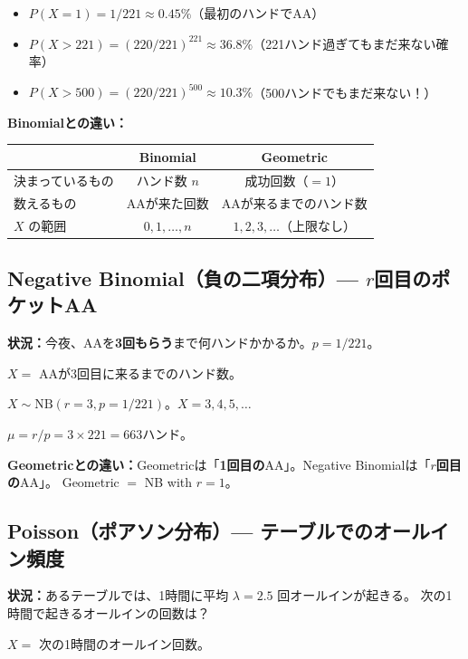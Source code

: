 \documentclass{article}
\theoremstyle{remark}
\begin{document}
\begin{itemize}
  \item $P(X = 1) = 1/221 \approx 0.45\%$（最初のハンドでAA）
  \item $P(X > 221) = (220/221)^{221} \approx 36.8\%$（221ハンド過ぎてもまだ来ない確率）
  \item $P(X > 500) = (220/221)^{500} \approx 10.3\%$（500ハンドでもまだ来ない！）
\end{itemize}

\textbf{Binomialとの違い：}
\begin{center}
  \begin{tabular}{lcc}
    \toprule
    & Binomial & Geometric \\ \midrule
    決まっているもの & ハンド数 $n$ & 成功回数（$=1$） \\
    数えるもの & AAが来た回数 & AAが来るまでのハンド数 \\
    $X$ の範囲 & $0, 1, \ldots, n$ & $1, 2, 3, \ldots$（上限なし）\\
    \bottomrule
  \end{tabular}
\end{center}

\subsection{Negative Binomial（負の二項分布）--- $r$回目のポケットAA}

\textbf{状況：}今夜、AAを\textbf{3回もらう}まで何ハンドかかるか。$p = 1/221$。

$X = $ AAが3回目に来るまでのハンド数。

$X \sim \text{NB}(r=3, p=1/221)$。$X = 3, 4, 5, \ldots$

$\mu = r/p = 3 \times 221 = 663$ハンド。

\textbf{Geometricとの違い：}Geometricは「\textbf{1回目の}AA」。Negative Binomialは「\textbf{$r$回目の}AA」。
Geometric $= $ NB with $r=1$。

\subsection{Poisson（ポアソン分布）--- テーブルでのオールイン頻度}

\textbf{状況：}あるテーブルでは、1時間に平均 $\lambda = 2.5$ 回オールインが起きる。
次の1時間で起きるオールインの回数は？

$X = $ 次の1時間のオールイン回数。
\end{document}
